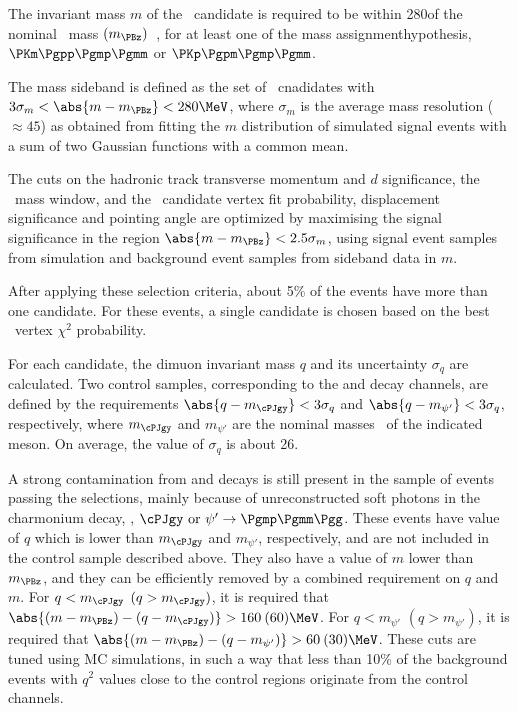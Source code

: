 The invariant mass $m$ of the \PBz\ candidate is required to be within 280\MeV of the nominal \PBz\ mass $(m_\PBz)$~\cite{PDG}, for at least one of the mass assignmenthypothesis, $\PKm\Pgpp\Pgmp\Pgmm$ or $\PKp\Pgpm\Pgmp\Pgmm$.

The mass sideband is defined as the set of \PBz\ cnadidates with $3\sigma_m < \abs{m-m_{\PBz}} < 280\MeV$, where $\sigma_m$ is the average mass resolution (${\approx}45$\MeV) as obtained from fitting the $m$ distribution of simulated signal events with a sum of two Gaussian functions with a common mean.

The cuts on the hadronic track transverse momentum and $d$ significance, the \cPKstz\ mass window, and the \PBz\ candidate vertex fit probability, displacement significance and pointing angle are optimized by maximising the signal significance in the region $\abs{m-m_{\PBz}} < 2.5\sigma_m$, using signal event samples from simulation and background event samples from sideband data in $m$.

After applying these selection criteria, about 5\% of the events have more than one candidate.
For these events, a single candidate is chosen based on the best \PBz\ vertex $\chi^2$ probability.

For each candidate, the dimuon invariant mass $q$ and its uncertainty $\sigma_{q}$ are calculated.
Two control samples, corresponding to the \BtoKstJpsi and \BtoKstpsip decay channels, are defined by the requirements $\abs{q - m_{\cPJgy}} < 3\sigma_{q}$ and $\abs{q - m_{\psi'}} < 3\sigma_{q}$, respectively, where $m_{\cPJgy}$ and $m_{\psi'}$ are the nominal masses~\cite{PDG} of the indicated meson.
On average, the value of $\sigma_{q}$ is about 26\MeV.

A strong contamination from \BtoKstJpsi and \BtoKstpsip decays is still present in the sample of events passing the selections, mainly because of unreconstructed soft photons in the charmonium decay, \ie, $\cPJgy\ {\rm or}\ \psi' \to \Pgmp \Pgmm \Pgg$.
These events have value of $q$ which is lower than $m_{\cPJgy}$ and $m_{\psi'}$, respectively, and are not included in the control sample described above.
They also have a value of $m$ lower than $m_{\PBz}$, and they can be efficiently removed by a combined requirement on $q$ and $m$.
For $q<m_{\cPJgy}$ $(q>m_{\cPJgy})$, it is required that $\abs{(m-m_{\PBz})-(q-m_{\cPJgy})}>160\: (60)\MeV$.
For $q<m_{\psi'}$ $(q>m_{\psi'})$, it is required that $\abs{(m-m_{\PBz})-(q-m_{\psi'})}>60\: (30)\MeV$.
These cuts are tuned using MC simulations, in such a way that less than 10\% of the background events with $q^2$ values close to the control regions originate from the control channels.

